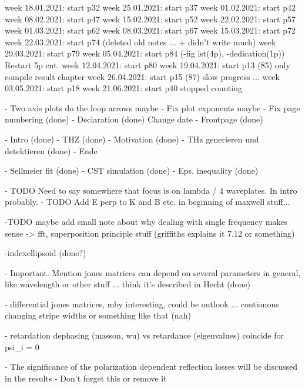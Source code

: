 week 18.01.2021: start p32
week 25.01.2021: start p37
week 01.02.2021: start p42
week 08.02.2021: start p47
week 15.02.2021: start p52
week 22.02.2021: start p57
week 01.03.2021: start p62
week 08.03.2021: start p67
week 15.03.2021: start p72
week 22.03.2021: start p74 (deleted old notes ... + didn't write much)
week 29.03.2021: start p79
week 05.04.2021: start p84 (-fig lst(4p), -dedication(1p)) Restart 5p cnt. 
week 12.04.2021: start p80
week 19.04.2021: start p13 (85) only compile result chapter
week 26.04.2021: start p15 (87) slow progress ...
week 03.05.2021: start p18
week 21.06.2021: start p40
stopped counting

- Two axis plots do the loop arrows maybe
- Fix plot exponents maybe
- Fix page numbering (done)
- Declaration (done) Change date
- Frontpage (done)

- Intro (done)
    - THZ (done)
    - Motivation (done)
- THz generieren und detektieren (done)
- Ende 

- Sellmeier fit (done)
- CST simulation (done)
- Eps. inequality (done)

- TODO Need to say somewhere that focus is on lambda / 4 waveplates. In intro probably.
- TODO Add E perp to K and B etc. in beginning of maxwell stuff...

-TODO maybe add small note about why dealing with single frequency makes sense -> fft, superposition principle stuff (griffiths explains it 7.12 or something)

-indexellipsoid (done?)

- Important. Mention jones matrices can depend on several parameters in general, like wavelength or other stuff ... think it's described in Hecht (done)

- differential jones matrices, mby interesting, could be outlook ... contionous changing stripe widths or something like that (nah)

- retardation dephasing (masson, wu) vs retardance (eigenvalues) coincide for psi_i = 0

- The significance of the polarization dependent reflection losses will be discussed in the results
    - Don't forget this or remove it
    

